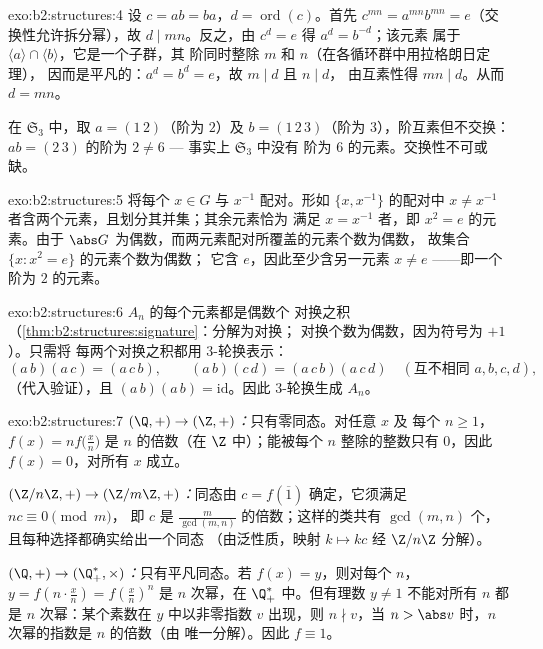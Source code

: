 \begin{solution}{exo:b2:structures:4}
设 $c = ab = ba$，$d = \operatorname{ord}(c)$。首先 $c^{mn} =
a^{mn} b^{mn} = e$（交换性允许拆分幂），故 $d
\mid mn$。反之，由 $c^d = e$ 得 $a^d = b^{-d}$；该元素
属于 $\langle a\rangle \cap \langle b\rangle$，它是一个子群，其
阶同时整除 $m$ 和 $n$（在各循环群中用拉格朗日定理），
因而是平凡的：$a^d = b^d = e$，故 $m \mid d$ 且 $n \mid d$，
由互素性得 $mn \mid d$。从而 $d = mn$。

在 $\mathfrak{S}_3$ 中，取 $a = (1\,2)$（阶为 $2$）及 $b =
(1\,2\,3)$（阶为 $3$），阶互素但不交换：$ab =
(2\,3)$ 的阶为 $2 \neq 6$ --- 事实上 $\mathfrak{S}_3$ 中没有
阶为 $6$ 的元素。交换性不可或缺。
\end{solution}

\begin{solution}{exo:b2:structures:5}
将每个 $x \in G$ 与 $x^{-1}$ 配对。形如 $\{x, x^{-1}\}$ 的配对中
$x \neq x^{-1}$ 者含两个元素，且划分其并集；其余元素恰为
满足 $x = x^{-1}$ 者，即 $x^2 =
e$ 的元素。由于 $\abs G$ 为偶数，而两元素配对所覆盖的元素个数为偶数，
故集合 $\{x : x^2 = e\}$ 的元素个数为偶数；
它含 $e$，因此至少含另一元素 $x \neq
e$ ——即一个阶为 $2$ 的元素。
\end{solution}

\begin{solution}{exo:b2:structures:6}
$A_n$ 的每个元素都是偶数个
对换之积（\cref{thm:b2:structures:signature}：分解为对换；
对换个数为偶数，因为符号为 $+1$）。只需将
每两个对换之积都用
$3$-轮换表示：
\[
(a\,b)(a\,c) = (a\,c\,b),
\qquad
(a\,b)(c\,d) = (a\,c\,b)(a\,c\,d) \quad (\text{互不相同 } a,b,c,d),
\]
（代入验证），且 $(a\,b)(a\,b) = \mathrm{id}$。因此
$3$-轮换生成 $A_n$。
\end{solution}

\begin{solution}{exo:b2:structures:7}
\emph{$(\Q,+) \to (\Z,+)$：}只有零同态。对任意 $x$ 及
每个 $n \geq 1$，$f(x) = n f\bigl(\frac xn\bigr)$ 是
$n$ 的倍数（在 $\Z$ 中）；能被每个 $n$ 整除的整数只有 $0$，因此
$f(x) = 0$，对所有 $x$ 成立。

\emph{$(\Z/n\Z, +) \to (\Z/m\Z, +)$：}同态由
$c = f(\overline 1)$ 确定，它须满足 $n c \equiv 0 \pmod m$，
即 $c$ 是 $\frac{m}{\gcd(m,n)}$ 的倍数；这样的类共有
$\gcd(m,n)$ 个，且每种选择都确实给出一个同态
（由泛性质，映射 $k \mapsto kc$ 经 $\Z/n\Z$ 分解）。

\emph{$(\Q, +) \to (\Q_+^*, \times)$：}只有平凡同态。若
$f(x) = y$，则对每个 $n$，$y = f(n \cdot \frac xn) =
f(\frac xn)^n$ 是 $n$ 次幂，在 $\Q_+^*$ 中。但有理数
$y \neq 1$ 不能对所有 $n$ 都是 $n$ 次幂：某个素数在
$y$ 中以非零指数 $v$ 出现，则 $n \nmid v$，当 $n > \abs
v$ 时，$n$ 次幂的指数是 $n$ 的倍数（由
唯一分解）。因此 $f \equiv 1$。
\end{solution}

